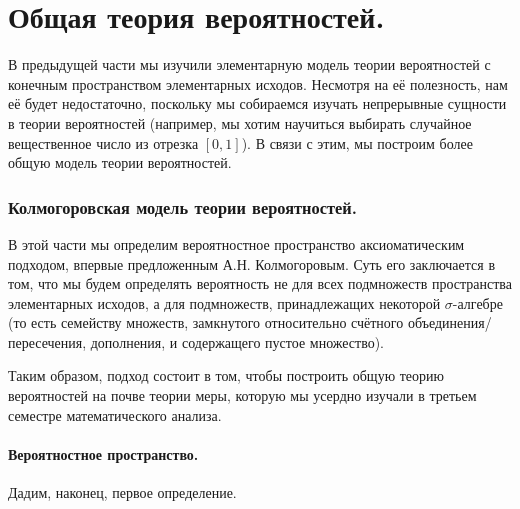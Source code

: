 \documentclass[../main.tex]{subfiles}
\begin{document}
\newpage
\part{Общая теория вероятностей.}

В предыдущей части мы изучили элементарную модель теории вероятностей с конечным пространством элементарных исходов. Несмотря на её полезность, нам её будет недостаточно, поскольку мы собираемся изучать непрерывные сущности в теории вероятностей (например, мы хотим научиться выбирать случайное вещественное число из отрезка $ [0,1] $). В связи с этим, мы построим более общую модель теории вероятностей.

\section{Колмогоровская модель теории вероятностей.}

В этой части мы определим вероятностное пространство аксиоматическим подходом, впервые предложенным А.Н. Колмогоровым. Суть его заключается в том, что мы будем определять вероятность не для всех подмножеств пространства элементарных исходов, а для подмножеств, принадлежащих некоторой $ \sigma $-алгебре (то есть семейству множеств, замкнутого относительно счётного объединения/пересечения, дополнения, и содержащего пустое множество).

Таким образом, подход состоит в том, чтобы построить общую теорию вероятностей на почве теории меры, которую мы усердно изучали в третьем семестре математического анализа.

\subsection{Вероятностное пространство.}

Дадим, наконец, первое определение.
\end{document}

